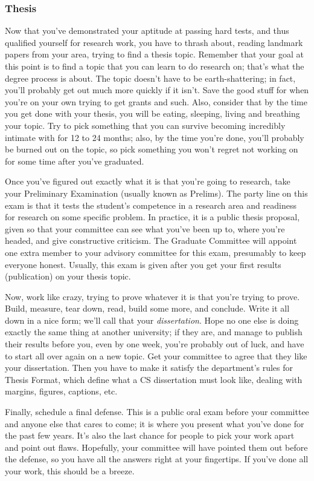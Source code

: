 \subsubsection{Thesis}
Now that you've demonstrated your aptitude at passing hard tests, and thus qualified yourself for research work, you have to thrash about, reading landmark papers from your area, trying to find a thesis topic. Remember that your goal at this point is to find a topic that you can learn to do research on; that's what the degree process is about. The topic doesn't have to be earth-shattering; in fact, you'll probably get out much more quickly if it isn't. Save the good stuff for when you're on your own trying to get grants and such. Also, consider that by the time you get done with your thesis, you will be eating, sleeping, living and breathing your topic. Try to pick something that you can survive becoming incredibly intimate with for 12 to 24 months; also, by the time you're done, you'll probably be burned out on the topic, so pick something you won't regret not working on for some time after you've graduated.

Once you've figured out exactly what it is that you're going to research, take your Preliminary Examination (usually known as Prelims). The party line on this exam is that it tests the student's competence in a research area and readiness for research on some specific problem. In practice, it is a public thesis proposal, given so that your committee can see what you've been up to, where you're headed, and give constructive criticism. The Graduate Committee will appoint one extra member to your advisory committee for this exam, presumably to keep everyone honest. Usually, this exam is given after you get your first results (publication) on your thesis topic.

Now, work like crazy, trying to prove whatever it is that you're trying to prove. Build, measure, tear down, read, build some more, and conclude. Write it all down in a nice form; we'll call that your \emph{dissertation}. Hope no one else is doing exactly the same thing at another university; if they are, and manage to publish their results before you, even by one week, you're probably out of luck, and have to start all over again on a new topic. Get your committee to agree that they like your dissertation. Then you have to make it satisfy the department's rules for Thesis Format, which define what a CS dissertation must look like, dealing with margins, figures, captions, etc.

Finally, schedule a final defense. This is a public oral exam before your committee and anyone else that cares to come; it is where you present what you've done for the past few years. It's also the last chance for people to pick your work apart and point out flaws. Hopefully, your committee will have pointed them out before the defense, so you have all the answers right at your fingertips. If you've done all your work, this should be a breeze.

